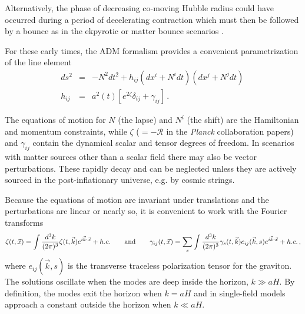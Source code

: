 
Alternatively, the phase of decreasing co-moving Hubble radius could have occurred during a period of decelerating contraction which must then be followed by a bounce as in the ekpyrotic or matter bounce scenarios \cite{Khoury:2001wf,Khoury:2001bz,Steinhardt:2001st,Nayeri:2005ck,Brandenberger:2012zb,Cai:2014jla,deHaro:2015wda}. 

For these early times, the ADM formalism provides a convenient parametrization of the line element
\begin{eqnarray}
\label{eq:metric}
ds^2&=&-N^2dt^2 +h_{ij}(dx^i+N^idt)(dx^j+N^jdt)\,\nonumber\\
h_{ij}&=&a^2(t)[e^{2\zeta}\delta_{ij}+\gamma_{ij}]\,.
\end{eqnarray}

The equations of motion for $N$ (the lapse) and $N^i$ (the shift) are the Hamiltonian and momentum constraints, while $\zeta$ ($=-\mathcal{R}$ in the {\it Planck} collaboration papers) and $\gamma_{ij}$ contain the dynamical scalar and tensor degrees of freedom. In scenarios with matter sources other than a scalar field there may also be vector perturbations. These rapidly decay and can be neglected unless they are actively sourced in the post-inflationary universe, e.g. by cosmic strings.

Because the equations of motion are invariant under translations and the perturbations are linear or nearly so, it is convenient to work with the Fourier transforms
\begin{equation}
\zeta(t,\vec{x})=\int \frac{d^3 k}{(2\pi)^3}\zeta(t,\vec{k})e^{i \vec{k}\cdot\vec{x}}+h.c.\qquad{\rm and}\qquad\gamma_{ij}(t,\vec{x})=\sum\limits_s\int\frac{d^3k}{(2\pi)^3}\gamma_s(t,\vec{k})e_{ij}(\vec{k},s)e^{i \vec{k}\cdot\vec{x}}+h.c.\,,
\end{equation}
where $e_{ij}(\vec{k},s)$ is the transverse traceless polarization tensor for the graviton. The solutions oscillate when the modes are deep inside the horizon, $k\gg aH$. By definition, the modes exit the horizon when $k=aH$ and in single-field models approach a constant outside the horizon when $k\ll aH$.

